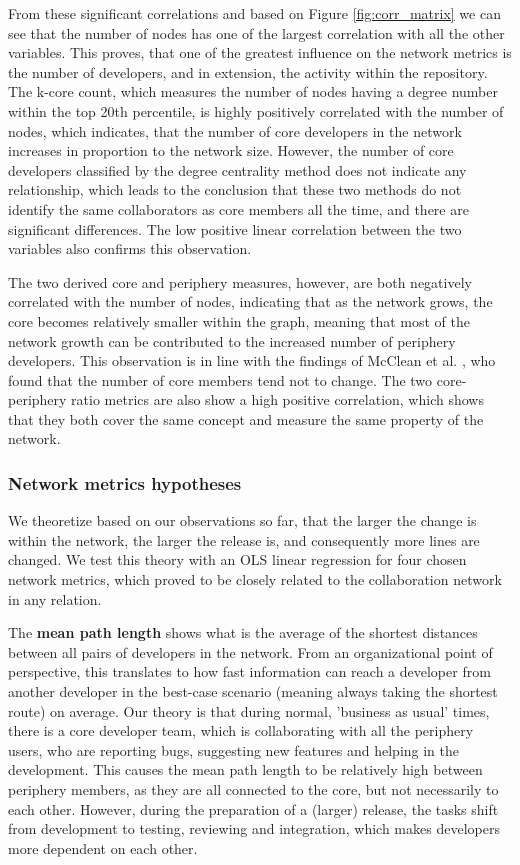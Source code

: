 From these significant correlations and based on Figure \ref{fig:corr_matrix} we can see that the number of nodes has one of the largest correlation with all the other variables. This proves, that one of the greatest influence on the network metrics is the number of developers, and in extension, the activity within the repository. The k-core count, which measures the number of nodes having a degree number within the top 20th percentile, is highly positively correlated with the number of nodes, which indicates, that the number of core developers in the network increases in proportion to the network size. However, the number of core developers classified by the degree centrality method does not indicate any relationship, which leads to the conclusion that these two methods do not identify the same collaborators as core members all the time, and there are significant differences. The low positive linear correlation between the two variables also confirms this observation.

The two derived core and periphery measures, however, are both negatively correlated with the number of nodes, indicating that as the network grows, the core becomes relatively smaller within the graph, meaning that most of the network growth can be contributed to the increased number of periphery developers. This observation is in line with the findings of McClean et al. \cite{mccleanSocialNetworkAnalysis2021}, who found that the number of core members tend not to change. The two core-periphery ratio metrics are also show a high positive correlation, which shows that they both cover the same concept and measure the same property of the network.

\subsubsection{Network metrics hypotheses}

We theoretize based on our observations so far, that the larger the change is within the network, the larger the release is, and consequently more lines are changed. We test this theory with an OLS linear regression for four chosen network metrics, which proved to be closely related to the collaboration network in any relation.

The \textbf{mean path length} shows what is the average of the shortest distances between all pairs of developers in the network. From an organizational point of perspective, this translates to how fast information can reach a developer from another developer in the best-case scenario (meaning always taking the shortest route) on average. Our theory is that during normal, 'business as usual' times, there is a core developer team, which is collaborating with all the periphery users, who are reporting bugs, suggesting new features and helping in the development. This causes the mean path length to be relatively high between periphery members, as they are all connected to the core, but not necessarily to each other. However, during the preparation of a (larger) release, the tasks shift from development to testing, reviewing and integration, which makes developers more dependent on each other. 

